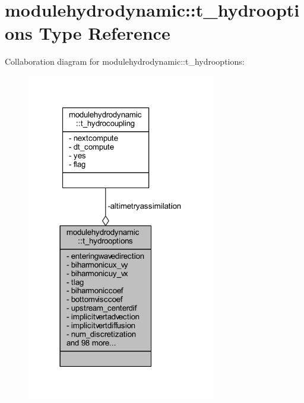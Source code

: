 \hypertarget{structmodulehydrodynamic_1_1t__hydrooptions}{}\section{modulehydrodynamic\+:\+:t\+\_\+hydrooptions Type Reference}
\label{structmodulehydrodynamic_1_1t__hydrooptions}


Collaboration diagram for modulehydrodynamic\+:\+:t\+\_\+hydrooptions\+:\nopagebreak
\begin{figure}[H]
\begin{center}
\leavevmode
\includegraphics[width=234pt]{structmodulehydrodynamic_1_1t__hydrooptions__coll__graph}
\end{center}
\end{figure}

